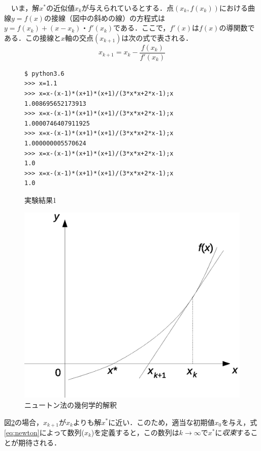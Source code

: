 \documentclass[a4j,11pt]{jarticle}
\begin{document}
　いま，解$x^*$の近似値$x_k$が与えられているとする．点$(x_k,f(x_k))$における曲線$y=f(x)$の接線（図中の斜めの線）の方程式は$y=f(x_k)+(x-x_k)・f'(x_k)$である．ここで，$f'(x)$は$f(x)$の導関数である．この接線と$x$軸の交点$(x_{k+1})$は次の式で表される\cite{author2,author3}．
\begin{equation}
x_{k+1}=x_k-\frac{f(x_k)}{f'(x_k)}
\label{eq:newton}
\end{equation}
\begin{figure}[h]
\begin{verbatim}
$ python3.6
>>> x=1.1
>>> x=x-(x-1)*(x+1)*(x+1)/(3*x*x+2*x-1);x
1.008695652173913
>>> x=x-(x-1)*(x+1)*(x+1)/(3*x*x+2*x-1);x
1.0000746407911925
>>> x=x-(x-1)*(x+1)*(x+1)/(3*x*x+2*x-1);x
1.000000005570624
>>> x=x-(x-1)*(x+1)*(x+1)/(3*x*x+2*x-1);x
1.0
>>> x=x-(x-1)*(x+1)*(x+1)/(3*x*x+2*x-1);x
1.0
\end{verbatim}
\caption{実験結果1}
\label{result}
\end{figure}
\begin{figure}[h]
\includegraphics[scale=0.6]{figure2.eps}
\caption{ニュートン法の幾何学的解釈}
\label{fig:newton}
\end{figure}
図\ref{fig:newton}の場合，$x_{k+1}$が$x_k$よりも解$x^*$に近い．このため，適当な初期値$x_0$を与え，式\ref{eq:newton}によって数列($x_k$)を定義すると，この数列は$k\rightarrow \infty$で$x^*$に{\em 収束}することが期待される．
\end{document}
